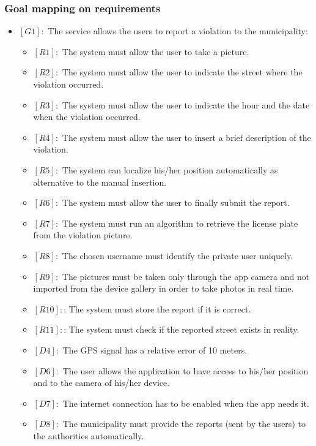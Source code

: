 \documentclass[titlepage]{article}
\begin{document}
\subsubsection{Goal mapping on requirements}
\begin{itemize}
 \item $[G1]:$ The service allows the users to report a violation to the municipality:
 \begin{itemize}
 	\item $[R1]:$ The system must allow the user to take a picture.
 	\item $[R2]:$ The system must allow the user to indicate the street where the violation occurred.
 	\item $[R3]:$ The system must allow the user to indicate the hour and the date when the violation occurred.
 	\item $[R4]:$ The system must allow the user to insert a brief description of the violation.
 	\item $[R5]:$ The system can localize his/her position automatically as alternative to the manual insertion.
 	\item $[R6]:$ The system must allow the user to finally submit the report.
 	\item $[R7]:$ The system must run an algorithm to retrieve the license plate from the violation picture.
 	\item $[R8]:$ The chosen username must identify the private user uniquely.
 	\item $[R9]:$ The pictures must be taken only through the app camera and not imported from the device gallery in order to take photos in real time.
 	\item $[R10]:$: The system must store the report if it is correct.
 	\item $[R11]:$: The system must check if the reported street exists in reality.
 	\item $[D4]:$ The GPS signal has a relative error of 10 meters.
 	\item $[D6]:$ The user allows the application to have access to his/her position and to the camera of his/her device.
 	\item $[D7]:$ The internet connection has to be enabled when the app needs it.
 	\item $[D8]:$ The municipality must provide the reports (sent by the users) to the authorities automatically.


\end{itemize}
\end{itemize}
\end{document}
